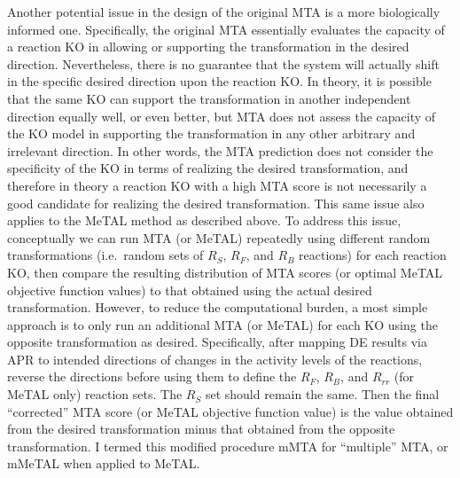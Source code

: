 \documentclass[12pt,twoside,openany,\mydriver]{thesis}  %
\begin{document}
Another potential issue in the design of the original MTA is a more biologically informed one. Specifically, the original MTA essentially evaluates the capacity of a reaction KO in allowing or supporting the transformation in the desired direction. Nevertheless, there is no guarantee that the system will actually shift in the specific desired direction upon the reaction KO. In theory, it is possible that the same KO can support the transformation in another independent direction equally well, or even better, but MTA does not assess the capacity of the KO model in supporting the transformation in any other arbitrary and irrelevant direction. In other words, the MTA prediction does not consider the specificity of the KO in terms of realizing the desired transformation, and therefore in theory a reaction KO with a high MTA score is not necessarily a good candidate for realizing the desired transformation. This same issue also applies to the MeTAL method as described above. To address this issue, conceptually we can run MTA (or MeTAL) repeatedly using different random transformations (i.e.~random sets of \(R_S\), \(R_F\), and \(R_B\) reactions) for each reaction KO, then compare the resulting distribution of MTA scores (or optimal MeTAL objective function values) to that obtained using the actual desired transformation. However, to reduce the computational burden, a most simple approach is to only run an additional MTA (or MeTAL) for each KO using the opposite transformation as desired. Specifically, after mapping DE results via APR to intended directions of changes in the activity levels of the reactions, reverse the directions before using them to define the \(R_F\), \(R_B\), and \(R_{rr}\) (for MeTAL only) reaction sets. The \(R_S\) set should remain the same. Then the final ``corrected'' MTA score (or MeTAL objective function value) is the value obtained from the desired transformation minus that obtained from the opposite transformation. I termed this modified procedure mMTA for ``multiple'' MTA, or mMeTAL when applied to MeTAL.
\end{document}
